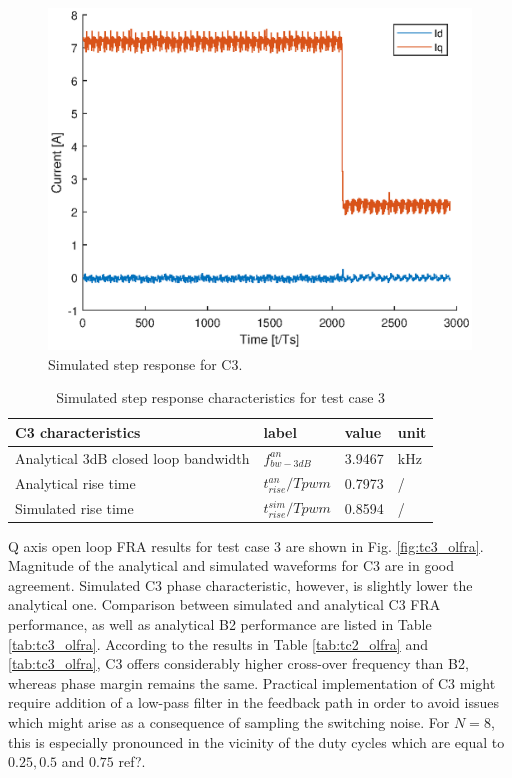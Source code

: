 \documentclass[journal]{IEEEtran}
\begin{document}
\begin{figure}[t!]
    \centerline{\includegraphics[width=0.95\linewidth]{figures/C3_step.eps}}
    \caption{Simulated step response for C3.}
    \label{fig:C3_step} 
\end{figure}

\begin{table}[h!]
			  \caption{Simulated step response characteristics for test case 3}
              \label{tab:C3_step}
              \centering
              \begin{tabular}{llll}
                           \midrule\midrule
        C3 characteristics & label & value   & unit\\
        \midrule               
                  Analytical 3dB closed loop bandwidth	& $f_{bw-3dB}^{an}$ & 3.9467
  &kHz\\  
                  Analytical rise time  & $t_{rise}^{an}/T{pwm}$ & 0.7973 & /   \\
                  Simulated rise time  & $t_{rise}^{sim}/T{pwm}$ & 0.8594 & /   \\
                  \midrule\midrule
                                                        
              \end{tabular}
\end{table}

Q axis open loop FRA results for test case 3 are shown in Fig. \ref{fig:tc3_olfra}. Magnitude of the analytical and simulated waveforms for C3 are in good agreement. Simulated C3 phase characteristic, however, is slightly lower the analytical one. Comparison between simulated and analytical C3 FRA performance, as well as analytical B2 performance are listed in Table \ref{tab:tc3_olfra}. According to the results in Table \ref{tab:tc2_olfra} and \ref{tab:tc3_olfra}, C3 offers considerably higher cross-over frequency than B2, whereas phase margin remains the same. Practical implementation of C3 might require addition of a low-pass filter in the feedback path in order to avoid issues which might arise as a consequence of sampling the switching noise. For $N=8$, this is especially pronounced in the vicinity of the duty cycles which are equal to $0.25, 0.5$ and $0.75$ ref?.\par
\end{document}
